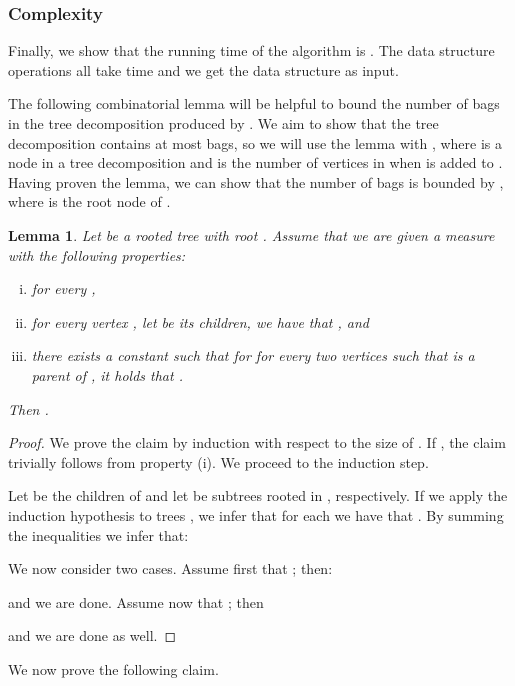 \documentclass[a4paper,11pt]{article}
\newtheorem{lemma}{Lemma}[section]
\theoremstyle{definition}
\theoremstyle{remark}
\begin{document}
\subsubsection{Complexity}
Finally, we show that the running time of the algorithm is .  The data structure operations all take time  and
we get the data structure  as input.

The following combinatorial lemma will be helpful to bound the number
of bags in the tree decomposition produced by .  We aim to
show that the tree decomposition  contains at most  bags, so we will use the lemma with , where
 is a node in a tree decomposition  and  is the number
of vertices in  when  is added to .  Having proven the
lemma, we can show that the number of bags is bounded by , where  is the root node of .

\begin{lemma}
  \label{lemma:bounded-tree}
  Let  be a rooted tree with root .  Assume that we are given a
  measure  with the following properties:
  \begin{enumerate}[(i)]
  \item[(i)]  for every ,
  \item[(ii)] for every vertex , let  be its
    children, we have that , and
  \item[(iii)] there exists a constant  such that for for every
    two vertices  such that  is a parent of , it holds
    that .
  \end{enumerate}
  Then .
\end{lemma}
\begin{proof}
  We prove the claim by induction with respect to the size of .
  If , the claim trivially follows from property (i).  We
  proceed to the induction step.
  
  Let  be the children of  and let
   be subtrees rooted in ,
  respectively.  If we apply the induction hypothesis to trees
  , we infer that for each  we have
  that .  By
  summing the inequalities we infer that:
  
  We now consider two cases.  Assume first that ; then:
  
  and we are done.  Assume now that ; then
  
  and we are done as well.
\end{proof}

We now prove the following claim.

\newcommand{\sm}{\textrm{small}}
\newcommand{\lr}{\textrm{large}}
\newcommand{\inte}{\textrm{int}}
\newcommand{\leaf}{\textrm{leaf}}
\end{document}
